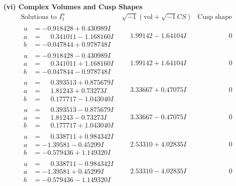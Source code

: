 \documentclass[1p]{elsarticle_modified}
\theoremstyle{definition}
\newcommand{\I}{\sqrt{-1}}
\begin{document}
\newpage\flushleft \textbf{(vi) Complex Volumes and Cusp Shapes}
$$\begin{array}{c|c|c}  
\text{Solutions to }I^u_{1}& \I (\text{vol} + \sqrt{-1}CS) & \text{Cusp shape}\\
 \hline 
\begin{aligned}
u &= -0.918428 + 0.430989 I \\
a &= \phantom{-}0.341011 - 1.168160 I \\
b &= -0.047844 + 0.978748 I\end{aligned}
 & \phantom{-}1.99142 - 1.64104 I & \phantom{-0.000000 } 0 \\ \hline\begin{aligned}
u &= -0.918428 - 0.430989 I \\
a &= \phantom{-}0.341011 + 1.168160 I \\
b &= -0.047844 - 0.978748 I\end{aligned}
 & \phantom{-}1.99142 + 1.64104 I & \phantom{-0.000000 } 0 \\ \hline\begin{aligned}
u &= \phantom{-}0.393513 + 0.875679 I \\
a &= \phantom{-}1.81243 + 0.73273 I \\
b &= \phantom{-}0.177717 - 1.043040 I\end{aligned}
 & \phantom{-}3.33667 + 0.47075 I & \phantom{-0.000000 } 0 \\ \hline\begin{aligned}
u &= \phantom{-}0.393513 - 0.875679 I \\
a &= \phantom{-}1.81243 - 0.73273 I \\
b &= \phantom{-}0.177717 + 1.043040 I\end{aligned}
 & \phantom{-}3.33667 - 0.47075 I & \phantom{-0.000000 } 0 \\ \hline\begin{aligned}
u &= \phantom{-}0.338711 + 0.984342 I \\
a &= -1.39581 - 0.45299 I \\
b &= -0.579436 + 1.149320 I\end{aligned}
 & \phantom{-}2.53310 + 4.02835 I & \phantom{-0.000000 } 0 \\ \hline\begin{aligned}
u &= \phantom{-}0.338711 - 0.984342 I \\
a &= -1.39581 + 0.45299 I \\
b &= -0.579436 - 1.149320 I\end{aligned}
 & \phantom{-}2.53310 - 4.02835 I & \phantom{-0.000000 } 0 \\ \hline\begin{aligned}

\end{aligned}
\end{array}$$
\end{document}
